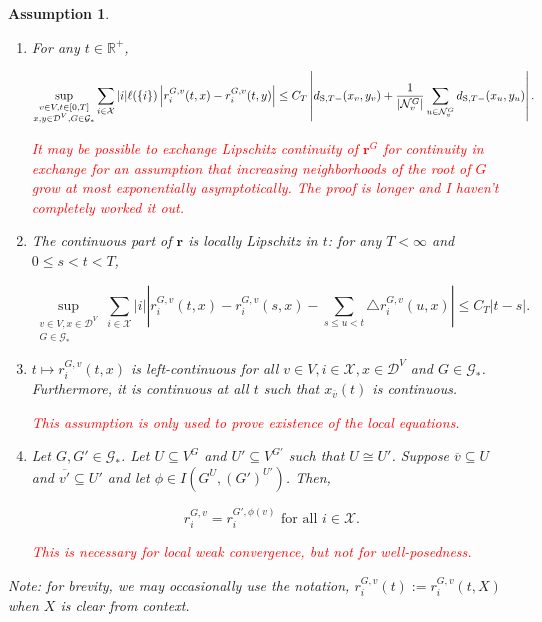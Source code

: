 \documentclass[12pt]{article}
\newcommand{\skipLine}{\vspace{12pt}}
\newcommand{\mb}{\mathbb}
\newcommand{\mc}{\mathcal}
\newcommand{\ov}{\overline}
\newcommand{\te}{\text}
\newcommand{\tr}{\textcolor{red}}
\newcommand{\defeq}{:=}								%
\newcommand{\cad}{\mc{D}}							%
\newcommand{\sta}{\mc{X}}							%
\newcommand{\gneigh}[2]{\mc{N}^{#1}_{#2}}			%
\newcommand{\cl}[1]{\ov{#1}}						%
\newcommand{\Xf}{X}									%
\newcommand{\Sm}{\ell}								%
\newcommand{\rate}{r}								%
\newcommand{\stmet}[1]{
\ifstrempty{#1}{
	d_{\te{S}}}{
	d_{\te{S},#1}}}									%
\newcommand{\xf}{x}									%
\newcommand{\xg}{y}									%
\newcommand{\vind}[1]{_{#1}}						%
\newcommand{\tme}[1]{(#1)}							%
\newcommand{\gind}[1]{^{#1}}						%
\newcommand{\vpara}[1]{^{#1}}						%
\newcommand{\stpara}[1]{_{#1}}						%
\newcommand{\gvpara}[2]{^{#1,#2}}					%
\newcommand{\rateset}{\mathbf{\rate}}				%
\newcommand{\jumpbd}[1]{C_{#1}}						%
\newcommand{\tmepro}[2]{(#1,#2)}					%
\newcommand{\Gs}{\mc{G}_\ast}						%
\newtheorem{assu}[thms]{Assumption}
\begin{document}
\begin{assu}
\begin{enumerate}
\item For any \(t \in \mb{R}^+\),

\begin{equation}
\sup_{\substack{v \in V,t \in [0,T]\\\xf,\xg \in \cad\vpara{V},G \in \Gs}} \sum_{i \in \sta}|i|\Sm(\{i\})\left|\rate\gvpara{G}{v}\stpara{i}\tmepro{t}{\xf} - \rate\gvpara{G}{v}\stpara{i}\tmepro{t}{\xg}\right| \leq \jumpbd{T}\left|\stmet{T-}(\xf\vind{v},\xg\vind{v}) + \frac{1}{|\gneigh{G}{v}|}\sum_{u\in\gneigh{G}{v}} \stmet{T-}(\xf\vind{u},\xg\vind{u})\right|.
\label{a::xLipschitz}
\end{equation}

\tr{It may be possible to exchange Lipschitz continuity of \(\rateset\gind{G}\) for continuity in exchange for an assumption that increasing neighborhoods of the root of \(G\) grow at most exponentially asymptotically. The proof is longer and I haven't completely worked it out.}

\item The continuous part of \(\rateset\) is locally Lipschitz in \(t\): for any \(T < \infty\) and \(0\leq s < t < T\),

\begin{equation}
\sup_{\substack{v \in V,\xf \in \cad^V\\ G \in \Gs}} \sum_{i\in \sta}|i|\left|\rate\gvpara{G}{v}\stpara{i}\tmepro{t}{\xf} - \rate\gvpara{G}{v}\stpara{i}\tmepro{s}{\xf} - \sum_{s\leq u < t} \triangle \rate\gvpara{G}{v}\stpara{i}\tmepro{u}{\xf}\right| \leq \jumpbd{T}\left|t - s\right|.
\label{a::tLipschitz}
\end{equation}

\item \(t\mapsto \rate\gvpara{G}{v}\stpara{i}\tmepro{t}{\xf}\) is left-continuous for all \(v \in V,i\in \sta,\xf\in \cad\vpara{V}\) and \(G \in \Gs\). Furthermore, it is continuous at all \(t\) such that \(\xf\vind{\cl{v}}\tme{t}\) is continuous. 

\tr{This assumption is only used to prove existence of the local equations.}

\item Let \(G,G'\in \Gs\). Let \(U \subseteq V\gind{G}\) and \(U' \subseteq V\gind{G'}\) such that \(U \cong U'\). Suppose \(\cl{v}\subseteq U\) and \(\cl{v'} \subseteq U'\) and let \(\phi \in I(G\vpara{U},(G')\vpara{U'})\). Then,

\[\rate\gvpara{G}{v}\stpara{i} = \rate\gvpara{G'}{\phi(v)}\stpara{i}\te{ for all } i \in \sta.\]

\tr{This is necessary for local weak convergence, but not for well-posedness.}
\end{enumerate}
\skipLine

Note: for brevity, we may occasionally use the notation, \(\rate\gvpara{G}{v}\stpara{i}\tme{t}\defeq \rate\gvpara{G}{v}\stpara{i}\tmepro{t}{\Xf}\) when \(\Xf\) is clear from context.
\label{a::pbasics}
\end{assu}
\end{document}
